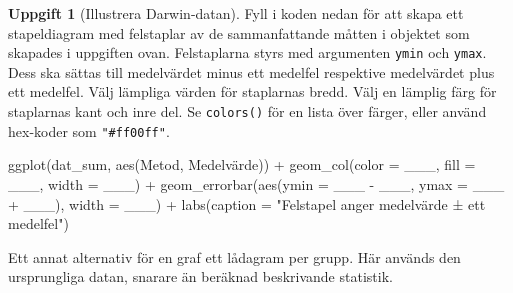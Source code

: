 \documentclass[
]{book}
\newenvironment{Shaded}{\begin{snugshade}}{\end{snugshade}}
\newcommand{\AttributeTok}[1]{\textcolor[rgb]{0.77,0.63,0.00}{#1}}
\newcommand{\FunctionTok}[1]{\textcolor[rgb]{0.00,0.00,0.00}{#1}}
\newcommand{\NormalTok}[1]{#1}
\newcommand{\SpecialCharTok}[1]{\textcolor[rgb]{0.00,0.00,0.00}{#1}}
\newcommand{\StringTok}[1]{\textcolor[rgb]{0.31,0.60,0.02}{#1}}
\theoremstyle{definition}
\theoremstyle{definition}
\theoremstyle{definition}
\newtheorem{exercise}{Uppgift}[chapter]
\theoremstyle{definition}
\theoremstyle{remark}
\begin{document}
\begin{exercise}[Illustrera Darwin-datan]

Fyll i koden nedan för att skapa ett stapeldiagram med felstaplar av de sammanfattande måtten i objektet som skapades i uppgiften ovan. Felstaplarna styrs med argumenten \texttt{ymin} och \texttt{ymax}. Dess ska sättas till medelvärdet minus ett medelfel respektive medelvärdet plus ett medelfel. Välj lämpliga värden för staplarnas bredd. Välj en lämplig färg för staplarnas kant och inre del. Se \texttt{colors()} för en lista över färger, eller använd hex-koder som \texttt{"\#ff00ff"}.

\begin{Shaded}
\begin{Highlighting}[]
\FunctionTok{ggplot}\NormalTok{(dat\_sum, }\FunctionTok{aes}\NormalTok{(Metod, Medelvärde)) }\SpecialCharTok{+}
  \FunctionTok{geom\_col}\NormalTok{(}\AttributeTok{color =}\NormalTok{ \_\_\_, }\AttributeTok{fill =}\NormalTok{ \_\_\_, }\AttributeTok{width =}\NormalTok{ \_\_\_) }\SpecialCharTok{+}
  \FunctionTok{geom\_errorbar}\NormalTok{(}\FunctionTok{aes}\NormalTok{(}\AttributeTok{ymin =}\NormalTok{ \_\_\_ }\SpecialCharTok{{-}}\NormalTok{ \_\_\_, }\AttributeTok{ymax =}\NormalTok{ \_\_\_ }\SpecialCharTok{+}\NormalTok{ \_\_\_),}
                \AttributeTok{width =}\NormalTok{ \_\_\_) }\SpecialCharTok{+}
  \FunctionTok{labs}\NormalTok{(}\AttributeTok{caption =} \StringTok{"Felstapel anger medelvärde ± ett medelfel"}\NormalTok{)}
\end{Highlighting}
\end{Shaded}

\end{exercise}

Ett annat alternativ för en graf ett lådagram per grupp. Här används den ursprungliga datan, snarare än beräknad beskrivande statistik.
\end{document}
